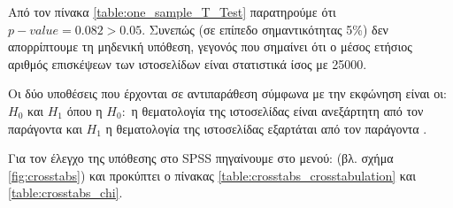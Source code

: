 \documentclass{assignment}
\begin{document}
\begin{Assignment}[Μέρος Β]
Από τον πίνακα \ref{table:one_sample_T_Test} παρατηρούμε ότι $p-value= 0.082 > 0.05$. Συνεπώς (σε επίπεδο σημαντικότητας 5\%) δεν απορρίπτουμε τη μηδενική υπόθεση, γεγονός που σημαίνει ότι ο μέσος ετήσιος αριθμός επισκέψεων των ιστοσελίδων είναι στατιστικά ίσος με 25000.


Οι δύο υποθέσεις που έρχονται σε αντιπαράθεση σύμφωνα με την εκφώνηση είναι οι: $H_0$ και $H_1$ όπου η $H_0:$ η θεματολογία της ιστοσελίδας είναι ανεξάρτητη από τον παράγοντα  και $H_1$ η θεματολογία της ιστοσελίδας εξαρτάται από τον παράγοντα .

Για τον έλεγχο της υπόθεσης στο SPSS πηγαίνουμε στο μενού:  (βλ. σχήμα \ref{fig:crosstabs}) και προκύπτει ο πίνακας \ref{table:crosstabs_crosstabulation} και \ref{table:crosstabs_chi}. 


\end{Assignment}
\end{document}
